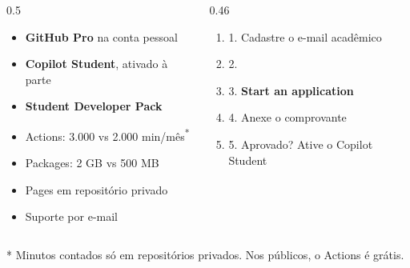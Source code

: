 \begin{frame}{}
  \vspace{0.3em}
  \begin{columns}[T]
    \begin{column}{0.5\textwidth}
      \begin{itemize}
        \item \textbf{GitHub Pro} na conta pessoal
        \item \textbf{Copilot Student}, ativado à parte
        \item \textbf{Student Developer Pack}
      \end{itemize}
      \vspace{.6em}
      {\footnotesize
      \begin{itemize}
        \item Actions: 3.000 vs 2.000 min/mês\textsuperscript{*}
        \item Packages: 2 GB vs 500 MB
        \item Pages em repositório privado
        \item Suporte por e-mail
      \end{itemize}}
    \end{column}
    \begin{column}{0.46\textwidth}
      \begin{enumerate}
        \item[] {\small 1. Cadastre o e-mail acadêmico}
        \item[] {\small 2. \\ }
        \item[] {\small 3. \textbf{Start an application}}
        \item[] {\small 4. Anexe o comprovante}
        \item[] {\small 5. Aprovado? Ative o Copilot Student}
      \end{enumerate}
    \end{column}
  \end{columns}

  \vspace{.5em}
  {\scriptsize\textcolor{codecomment}{* Minutos contados só em repositórios privados. Nos públicos, o Actions é grátis.}}

\end{frame}

